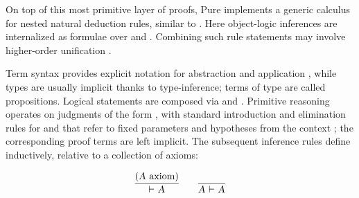 \begin{isabellebody}
\begin{isamarkuptext}
  On top of this most primitive layer of proofs, Pure implements a
  generic calculus for nested natural deduction rules, similar to
  \cite{Schroeder-Heister:1984}.  Here object-logic inferences are
  internalized as formulae over \isa{{\isachardoublequote}{\isasymAnd}{\isachardoublequote}} and \isa{{\isachardoublequote}{\isasymLongrightarrow}{\isachardoublequote}}.
  Combining such rule statements may involve higher-order unification
  \cite{paulson-natural}.%
\end{isamarkuptext}%
\isamarkuptrue%
%
\isamarkuptrue%
%
\begin{isamarkuptext}%
Term syntax provides explicit notation for abstraction  and application , while types are usually
  implicit thanks to type-inference; terms of type  are
  called propositions.  Logical statements are composed via  and .  Primitive reasoning operates on
  judgments of the form \isa{{\isachardoublequote}{\isasymGamma}\ {\isasymturnstile}\ {\isasymphi}{\isachardoublequote}}, with standard introduction
  and elimination rules for \isa{{\isachardoublequote}{\isasymAnd}{\isachardoublequote}} and \isa{{\isachardoublequote}{\isasymLongrightarrow}{\isachardoublequote}} that refer to
  fixed parameters  and hypotheses
   from the context \isa{{\isachardoublequote}{\isasymGamma}{\isachardoublequote}};
  the corresponding proof terms are left implicit.  The subsequent
  inference rules define \isa{{\isachardoublequote}{\isasymGamma}\ {\isasymturnstile}\ {\isasymphi}{\isachardoublequote}} inductively, relative to a
  collection of axioms:

  \[
  \infer{\isa{{\isachardoublequote}{\isasymturnstile}\ A{\isachardoublequote}}}{(\isa{{\isachardoublequote}A{\isachardoublequote}} \text{~axiom})}
  \qquad
  \infer{\isa{{\isachardoublequote}A\ {\isasymturnstile}\ A{\isachardoublequote}}}{}
  \]


\end{isamarkuptext}
\end{isabellebody}
